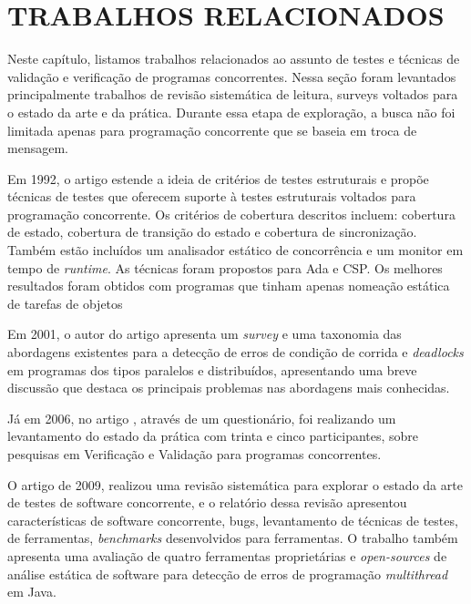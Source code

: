 
\chapter{TRABALHOS RELACIONADOS}
\label{cap:trabalhos_relacionados}


Neste capítulo, listamos trabalhos relacionados ao assunto de testes e técnicas de validação e verificação de programas concorrentes. Nessa seção foram levantados principalmente trabalhos de revisão sistemática de leitura, surveys voltados para o estado da arte e da prática. Durante essa etapa de exploração, a busca não foi limitada apenas para programação concorrente que se baseia em troca de mensagem.

Em 1992, o artigo \cite{taylor_structural_1992} estende a ideia de critérios de testes estruturais e propõe técnicas de testes que oferecem suporte à testes estruturais voltados para programação concorrente. Os critérios de cobertura descritos incluem: cobertura de estado, cobertura de transição do estado e cobertura de sincronização.  Também estão incluídos um analisador estático de concorrência e um monitor em tempo de \textit{runtime}. As técnicas foram propostos para Ada e CSP. Os melhores resultados foram obtidos com programas que tinham apenas nomeação estática de tarefas de objetos

Em 2001, o autor do artigo \cite{al-iadan_survey_2001} apresenta um \textit{survey} e uma taxonomia das abordagens existentes para a detecção de erros de condição de corrida e \textit{deadlocks} em programas dos tipos paralelos e distribuídos, apresentando uma breve discussão que destaca os principais problemas nas abordagens mais conhecidas. 

Já em 2006, no artigo \cite{wojcicki_state--practice_2006}, através de um questionário, foi realizando um levantamento do estado da prática com trinta e cinco participantes, sobre pesquisas em Verificação e Validação para programas concorrentes.

O artigo \cite{mamun_concurrent_2009} de 2009, realizou uma revisão sistemática para explorar o estado da arte de testes de software concorrente, e o relatório dessa revisão apresentou características de software concorrente, bugs, levantamento de técnicas de testes, de ferramentas, \textit{benchmarks} desenvolvidos para ferramentas. O trabalho também apresenta uma avaliação de quatro ferramentas proprietárias e \textit{open-sources} de análise estática de software para detecção de erros de programação \textit{multithread} em Java.

